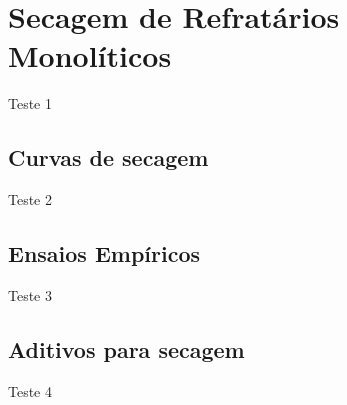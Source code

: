 \section{Secagem de Refratários Monolíticos}\label{secagem}
Teste 1

    \subsection{Curvas de secagem}
    Teste 2 

    \subsection{Ensaios Empíricos}
    Teste 3

    \subsection{Aditivos para secagem}
    Teste 4    
        
